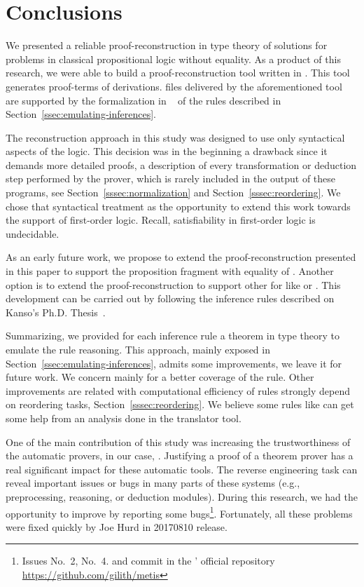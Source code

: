 \documentclass[../main.tex]{subfiles}
\begin{document}

\section{Conclusions}
\label{sec:conclusions}

We presented a reliable proof-reconstruction in type theory of \Metis
solutions for problems in classical propositional logic without
equality. As a product of this research, we were able to build a proof-reconstruction tool written in \Haskell. This tool generates
\Agda proof-terms of \Metis \TSTP derivations. \Agda files
delivered by the aforementioned tool are supported by the
formalization in \Agda~\cite{AgdaProp,AgdaMetis} of the \Metis rules
described in Section~\ref{ssec:emulating-inferences}.

The reconstruction approach in this study was designed to use
only syntactical aspects of the logic.
This decision was in the beginning a drawback
since it demands more detailed proofs, a
description of every transformation or deduction step performed by
the prover, which is rarely included in the output of these programs,
see Section~\ref{sssec:normalization} and Section~\ref{sssec:reordering}.
We chose that syntactical treatment as the opportunity
to extend this work towards the support of first-order logic.
Recall, satisfiability in first-order logic is undecidable.

As an early future work, we propose to extend the
proof-reconstruction presented in this paper to support the
proposition fragment with equality of \Metis.
Another option is to extend the proof-reconstruction to support other \ATPs for \CPL like  or .
This development can be carried out by following the 
inference rules described on Kanso's Ph.D. Thesis~\cite{Kanso2012}.

Summarizing, we provided for each \Metis inference rule a theorem in
type theory to emulate the rule reasoning. This approach, mainly
exposed in Section~\ref{ssec:emulating-inferences},
admits some improvements, we leave it for future work. We concern
mainly for a better coverage of the \simplify rule.
Other improvements are related with computational efficiency of
rules strongly depend on reordering tasks,
Section~\ref{sssec:reordering}.
We believe some rules like \canonicalize can get some help from an analysis done in the translator tool.

One of the main contribution of this study was
increasing the trustworthiness of the automatic provers,
in our case, \Metis.
Justifying a proof of a theorem prover
has a real significant impact for these automatic tools.
The reverse engineering task can reveal important issues or bugs
in many parts of these systems (e.g., preprocessing, reasoning, or
deduction modules). During this research, we had the opportunity
to improve \Metis by reporting some bugs\footnote{Issues No.~2,
No.~4. and commit  in the \Metis' official repository
\url{https://github.com/gilith/metis}}.
Fortunately, all these problems were fixed quickly by Joe Hurd in
20170810 release.
\end{document}

